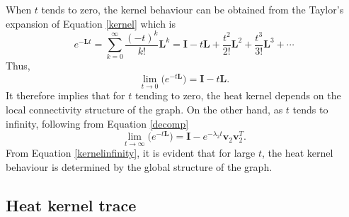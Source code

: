 \documentclass[10pt,a4paper]{article}
\theoremstyle{plain}
\theoremstyle{definition}
\begin{document}
        When $t$ tends to zero, the kernel behaviour can be obtained from the Taylor's expansion of  Equation \ref{kernel} which is 
        \begin{equation}
        e^{-\mathbf{L}t} = \sum_{k=0}^{\infty} \frac{(-t)^k}{k!} \mathbf{L}^k = \mathbf{I} -t \mathbf{L} + \frac{ t^2}{2!}\mathbf{L}^2 + \frac{ t^3 }{3!}\mathbf{L}^3 + \cdots
        \end{equation}
        Thus,
        \begin{equation}
        \lim_{t\longrightarrow 0} \Big(e^{-t\mathbf{L}}\Big) = \mathbf{I} - t\mathbf{L}.
        \label{kerneltozero}
        \end{equation}
        It therefore implies that for $t$ tending to zero, the heat kernel depends on the local connectivity structure of the graph.
        On the other hand, as $t$ tends to infinity, following from Equation \ref{decomp}
        \begin{equation}
        \lim_{t\longrightarrow \infty} \Big(e^{-t\mathbf{L}}\Big) = \mathbf{I} - e^{-\lambda_2 t} \mathbf{v}_2 \mathbf{v} _2^T.
        \label{kernelinfinity}  
        \end{equation}
        From Equation \ref{kernelinfinity}, it is evident that for large $t$, the heat kernel behaviour is determined by the global structure of the graph. 
        
        \subsection{Heat kernel trace}
        
\end{document}
